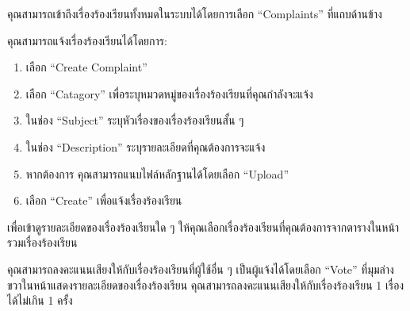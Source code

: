 คุณสามารถเข้าถึงเรื่องร้องเรียนทั้งหมดในระบบได้โดยการเลือก ``Complaints'' ที่แถบด้านข้าง

\pagebreak[4]



คุณสามารถแจ้งเรื่องร้องเรียนได้โดยการ:

\begin{enumerate}
    \item เลือก ``Create Complaint''
    \item เลือก ``Catagory'' เพื่อระบุหมวดหมู่ของเรื่องร้องเรียนที่คุณกำลังจะแจ้ง
    \item ในช่อง ``Subject'' ระบุหัวเรื่องของเรื่องร้องเรียนสั้น ๆ
    \item ในช่อง ``Description'' ระบุรายละเอียดที่คุณต้องการจะแจ้ง
    \item หากต้องการ คุณสามารถแนบไฟล์หลักฐานได้โดยเลือก ``Upload''
    \item เลือก ``Create'' เพื่อแจ้งเรื่องร้องเรียน
\end{enumerate}

\pagebreak[4]



เพื่อเข้าดูรายละเอียดของเรื่องร้องเรียนใด ๆ ให้คุณเลือกเรื่องร้องเรียนที่คุณต้องการจากตารางในหน้ารวมเรื่องร้องเรียน

\pagebreak[3]


คุณสามารถลงคะแนนเสียงให้กับเรื่องร้องเรียนที่ผู้ใช้อื่น ๆ เป็นผู้แจ้งได้โดยเลือก ``Vote''
ที่มุมล่างขวาในหน้าแสดงรายละเอียดของเรื่องร้องเรียน
คุณสามารถลงคะแนนเสียงให้กับเรื่องร้องเรียน 1 เรื่องได้ไม่เกิน 1 ครั้ง

\pagebreak[4]

